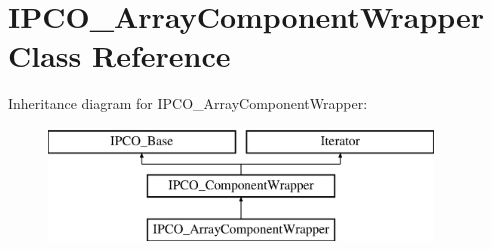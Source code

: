 \hypertarget{class_i_p_c_o___array_component_wrapper}{\section{I\-P\-C\-O\-\_\-\-Array\-Component\-Wrapper Class Reference}
\label{class_i_p_c_o___array_component_wrapper}
}
Inheritance diagram for I\-P\-C\-O\-\_\-\-Array\-Component\-Wrapper\-:\begin{figure}[H]
\begin{center}
\leavevmode
\includegraphics[height=3.000000cm]{class_i_p_c_o___array_component_wrapper}
\end{center}
\end{figure}
